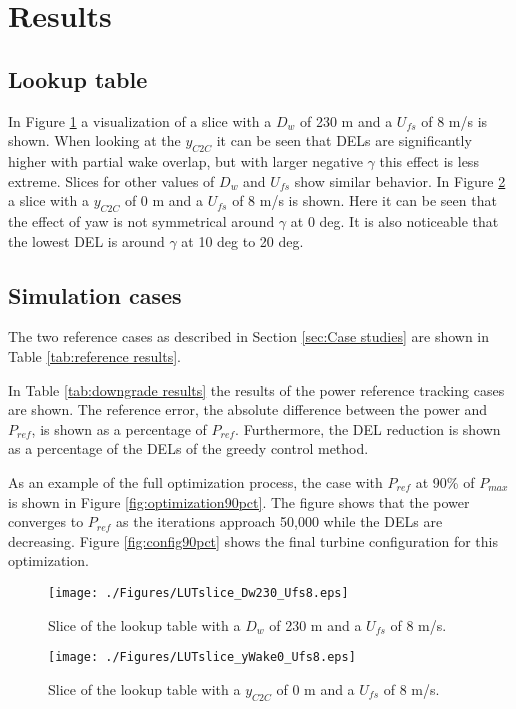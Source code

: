 \section{Results}

\subsection{Lookup table}
In Figure \ref{fig:LUTsliceC2C} a visualization of a slice with a $D_{w}$ of 230 m and a $U_{fs}$ of 8 m/s is shown. When looking at the $y_{C2C}$ it can be seen that DELs are significantly higher with partial wake overlap, but with larger negative $\gamma$ this effect is less extreme. Slices for other values of $D_{w}$ and $U_{fs}$ show similar behavior. In Figure \ref{fig:LUTsliceDw} a slice with a $y_{C2C}$ of 0 m and a $U_{fs}$ of 8 m/s is shown. Here it can be seen that the effect of yaw is not symmetrical around $\gamma$ at 0 deg. It is also noticeable that the lowest DEL is around $\gamma$ at 10 deg to 20 deg.

\subsection{Simulation cases} \label{sec:Simulation cases}
The two reference cases as described in Section \ref{sec:Case studies} are shown in Table \ref{tab:reference results}. 

In Table \ref{tab:downgrade results} the results of the power reference tracking cases are shown. The reference error, the absolute difference between the power and $P_{ref}$, is shown as a percentage of $P_{ref}$. Furthermore, the DEL reduction is shown as a percentage of the DELs of the greedy control method. 

As an example of the full optimization process, the case with $P_{ref}$ at 90\% of $P_{max}$ is shown in Figure \ref{fig:optimization90pct}. The figure shows that the power converges to $P_{ref}$ as the iterations approach 50,000 while the DELs are decreasing. Figure \ref{fig:config90pct} shows the final turbine configuration for this optimization. 

\begin{figure}
	\texttt{[image: ./Figures/LUTslice\_Dw230\_Ufs8.eps]}
	\caption{Slice of the lookup table with a $D_{w}$ of 230 m and a $U_{fs}$ of 8 m/s. }
	\label{fig:LUTsliceC2C}
\end{figure}

\begin{figure}
	\texttt{[image: ./Figures/LUTslice\_yWake0\_Ufs8.eps]}
	\caption{Slice of the lookup table with a $y_{C2C}$ of 0 m and a $U_{fs}$ of 8 m/s. }
	\label{fig:LUTsliceDw}
\end{figure}

